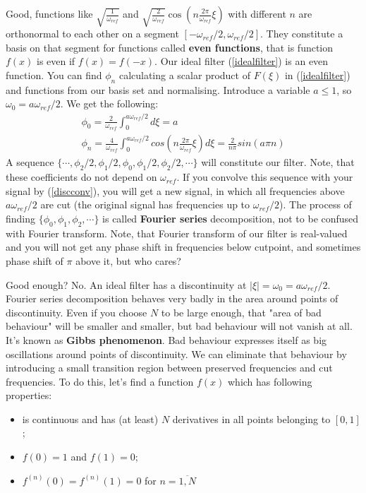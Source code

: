 \documentclass[a4paper,11pt,fleqn]{article}
\let\oldref\ref
\renewcommand{\ref}[1]{(\oldref{#1})}
\begin{document}
Good, functions like $\sqrt{\frac{1}{\omega_{ref}}}$ and $\sqrt{\frac{2}{\omega_{ref}}} \cos(n \frac{2 \pi}{\omega_{ref}} \xi)$ with
different $n$ are orthonormal to each other on a segment $[-\omega_{ref}/2, \omega_{ref}/2]$. They constitute a basis on that
segment for functions called \textbf{even functions}, that is function $f(x)$ is even if $f(x)=f(-x)$. Our ideal filter
\ref{idealfilter} is an even function. You can find $\phi_{n}$ calculating a scalar product of $F(\xi)$ in \ref{idealfilter} and
functions from our basis set and normalising. Introduce a variable $a \leq 1$, so $\omega_{0} = a \omega_{ref}/2$. We get the
following:
\begin{equation}
\begin{aligned}
\phi_{0} = \frac{2}{\omega_{ref}}\int_{0}^{a \omega_{ref}/2}d\xi = a \\
\phi_{n} = \frac{4}{\omega_{ref}}\int_{0}^{a \omega_{ref}/2}cos(n \frac{2 \pi}{\omega_{ref}} \xi)d\xi = \frac{2}{n \pi} sin (a \pi n)
\end{aligned}
\end{equation}
A sequence $\{\cdots, \phi_{2}/2, \phi_{1}/2, \phi_{0}, \phi_{1}/2, \phi_{2}/2, \cdots\}$ will constitute our filter. Note, that
these coefficients do not depend on $\omega_{ref}$. If you convolve this sequence with your signal by \ref{discconv}, you will get
a new signal, in which all frequencies above $a\omega_{ref}/2$ are cut (the original signal has frequencies up to
$\omega_{ref}/2$). The process of finding $\{\phi_{0}, \phi_{1}, \phi_{2}, \cdots\}$ is called \textbf{Fourier series}
decomposition, not to be confused with Fourier transform. Note, that Fourier transform of our filter is real-valued and you will
not get any phase shift in frequencies below cutpoint, and sometimes phase shift of $\pi$ above it, but who cares?

Good enough? No. An ideal filter has a discontinuity at $\left|\xi\right| = \omega_{0} = a \omega_{ref}/2$. Fourier series decomposition behaves very badly in the area around points of discontinuity. Even if
you choose $N$ to be large enough, that "area of bad behaviour" will be smaller and smaller, but bad behaviour will not vanish at all. It's known as \textbf{Gibbs phenomenon}. Bad behaviour expresses itself as
big oscillations around points of discontinuity. We can eliminate that behaviour by introducing a small transition region between
preserved frequencies and cut frequencies. To do this, let's find a function $f(x)$ which has following properties:
\begin{itemize}
\item is continuous and has (at least) $N$ derivatives in all points belonging to $[0,1]$;
\item $f(0) = 1$ and $f(1) = 0$;
\item $f^{(n)}(0) = f^{(n)}(1) = 0$ for $n = \overline{1,N}$
\end{itemize}
\end{document}
